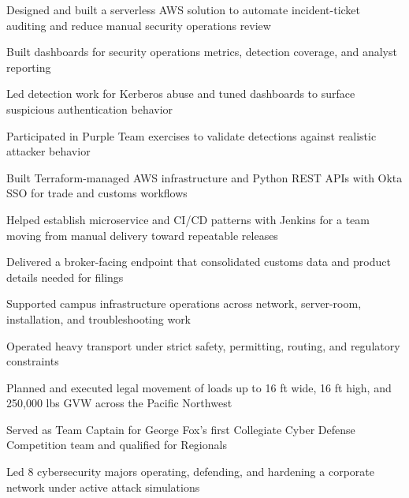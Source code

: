 \documentclass[10pt]{article}
\begin{document}
\begin{entryitems}
  \item Designed and built a serverless AWS solution to automate incident-ticket auditing and reduce manual security operations review
  \item Built dashboards for security operations metrics, detection coverage, and analyst reporting
  \item Led detection work for Kerberos abuse and tuned dashboards to surface suspicious authentication behavior
  \item Participated in Purple Team exercises to validate detections against realistic attacker behavior
\end{entryitems}

\begin{entryitems}
  \item Built Terraform-managed AWS infrastructure and Python REST APIs with Okta SSO for trade and customs workflows
  \item Helped establish microservice and CI/CD patterns with Jenkins for a team moving from manual delivery toward repeatable releases
  \item Delivered a broker-facing endpoint that consolidated customs data and product details needed for filings
\end{entryitems}

\newpage
{}
\begin{entryitems}
  \item Supported campus infrastructure operations across network, server-room, installation, and troubleshooting work
\end{entryitems}

\begin{entryitems}
  \item Operated heavy transport under strict safety, permitting, routing, and regulatory constraints
  \item Planned and executed legal movement of loads up to 16 ft wide, 16 ft high, and 250,000 lbs GVW across the Pacific Northwest
\end{entryitems}

\begin{entryitems}
  \item Served as Team Captain for George Fox's first Collegiate Cyber Defense Competition team and qualified for Regionals
  \item Led 8 cybersecurity majors operating, defending, and hardening a corporate network under active attack simulations
\end{entryitems}
\end{document}
